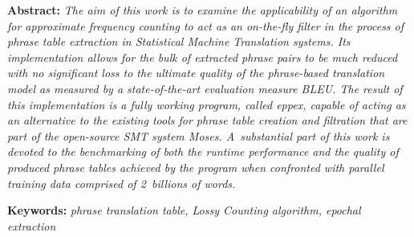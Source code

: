 \documentclass[12pt,a4paper]{report}
\let\openright=\clearpage
\begin{document}
{\textbf{Abstract:}
\emph{The aim of this work is to examine the applicability of an algorithm for
approximate frequency counting to act as an on-the-fly filter in the process
of phrase table extraction in Statistical Machine Translation systems.
Its implementation allows for the bulk of extracted phrase pairs to be much
reduced with no significant loss to the ultimate quality of the phrase-based
translation model as measured by a state-of-the-art evaluation measure BLEU.
The result of this implementation is a fully working program, called eppex,
capable of acting as an alternative to the existing tools for phrase table
creation and filtration that are part of the open-source SMT system Moses.
A~substantial part of this work is devoted to the benchmarking of both
the runtime performance and the quality of produced phrase tables achieved
by the program when confronted with parallel training data comprised of
2~billions of words.}

\textbf{Keywords:}
\emph{phrase translation table, Lossy Counting algorithm, epochal extraction}

\vss}

\newpage


\openright
\pagestyle{plain}
\setcounter{page}{1}
\tableofcontents
















\cleardoublepage
{}
{}
\end{document}
